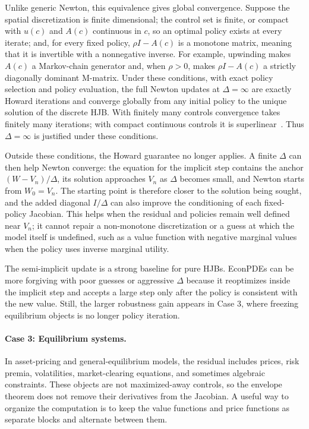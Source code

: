 \documentclass[11pt]{article}
\numberwithin{equation}{section}
\begin{document}
				Unlike generic Newton, this equivalence gives global convergence. Suppose the spatial discretization is finite dimensional; the control set is finite, or compact with $u(c)$ and $A(c)$ continuous in $c$, so an optimal policy exists at every iterate; and, for every fixed policy, $\rho I-A(c)$ is a monotone matrix, meaning that it is invertible with a nonnegative inverse. For example, upwinding makes $A(c)$ a Markov-chain generator and, when $\rho>0$, makes $\rho I-A(c)$ a strictly diagonally dominant M-matrix. Under these conditions, with exact policy selection and policy evaluation, the full Newton updates at $\Delta=\infty$ are exactly Howard iterations and converge globally from any initial policy to the unique solution of the discrete HJB. With finitely many controls convergence takes finitely many iterations; with compact continuous controls it is superlinear~\citep{puterman1979convergence,bokanowski2009convergence}. Thus $\Delta=\infty$ is justified under these conditions.

				Outside these conditions, the Howard guarantee no longer applies. A finite $\Delta$ can then help Newton converge: the equation for the implicit step contains the anchor $(W-V_n)/\Delta$, its solution approaches $V_n$ as $\Delta$ becomes small, and Newton starts from $W_0=V_n$. The starting point is therefore closer to the solution being sought, and the added diagonal $I/\Delta$ can also improve the conditioning of each fixed-policy Jacobian. This helps when the residual and policies remain well defined near $V_n$; it cannot repair a non-monotone discretization or a guess at which the model itself is undefined, such as a value function with negative marginal values when the policy uses inverse marginal utility.

				The semi-implicit update is a strong baseline for pure HJBs. EconPDEs can be more forgiving with poor guesses or aggressive $\Delta$ because it reoptimizes inside the implicit step and accepts a large step only after the policy is consistent with the new value. Still, the larger robustness gain appears in Case 3, where freezing equilibrium objects is no longer policy iteration.

			\paragraph*{Case 3: Equilibrium systems.} In asset-pricing and general-equilibrium models, the residual includes prices, risk premia, volatilities, market-clearing equations, and sometimes algebraic constraints. These objects are not maximized-away controls, so the envelope theorem does not remove their derivatives from the Jacobian. A useful way to organize the computation is to keep the value functions and price functions as separate blocks and alternate between them.
\end{document}
